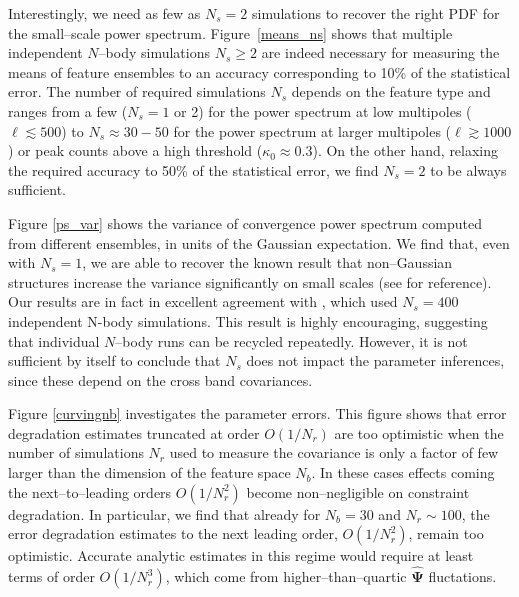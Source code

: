 \documentclass[reprint,aps,prd,superscriptaddress,showkeys,showpacs]{revtex4-1}
\newcommand{\bbh}[1]{\mathbf{\hat{#1}}}
\begin{document}
Interestingly, we need as few as $N_s=2$ simulations to recover the
right PDF
for the small--scale power spectrum.  Figure~\ref{means_ns} shows that
multiple independent $N$--body simulations $N_s\geq2$ are indeed
necessary for measuring the means of feature ensembles to an accuracy
corresponding to 10\% of the statistical error. The number of required
simulations $N_s$ depends on the feature type and ranges from a few ($N_s=1$
or 2) for the power spectrum at low multipoles ($\ell\lesssim 500$) to
$N_s\approx 30-50$ for the power spectrum at larger
multipoles ($\ell\gtrsim1000$) or peak counts above a high threshold
($\kappa_0\approx0.3$).
On the other hand, relaxing the required accuracy to 50\% of the statistical
error, we find $N_s=2$ to be always sufficient.

Figure \ref{ps_var} shows the variance of convergence power spectrum
computed from different ensembles, in units of the Gaussian
expectation. We find that, even with $N_s=1$, we are able to recover
the known result that non--Gaussian structures increase the variance
significantly on small scales (see \citep{Sato12,TakadaSpergel14} for reference). 
Our results are in fact in excellent agreement with \citep{Sato12}, which used $N_s=400$ independent N-body
simulations.  This result is highly encouraging, suggesting that
individual $N$--body runs can be recycled repeatedly.  However, it is not
sufficient by itself to conclude that $N_s$ does not impact the
parameter inferences, since these depend on the cross band
covariances.

Figure \ref{curvingnb} investigates the parameter errors. This figure
shows that error degradation estimates truncated at order $O(1/N_r)$
are too optimistic when the number of simulations $N_r$ used to
measure the covariance is only a factor of few larger than the
dimension of the feature space $N_b$. In these cases effects coming
the next--to--leading orders $O(1/N_r^2)$ become non--negligible on
constraint degradation. In particular, we find that already for
$N_b=30$ and $N_r\sim100$, the error degradation estimates to the next
leading order, $O(1/N_r^2)$, remain too optimistic. Accurate analytic
estimates in this regime would require at least terms of order
$O(1/N_r^3)$, which come from higher--than--quartic $\bbh{\Psi}$
fluctations.
\end{document}
